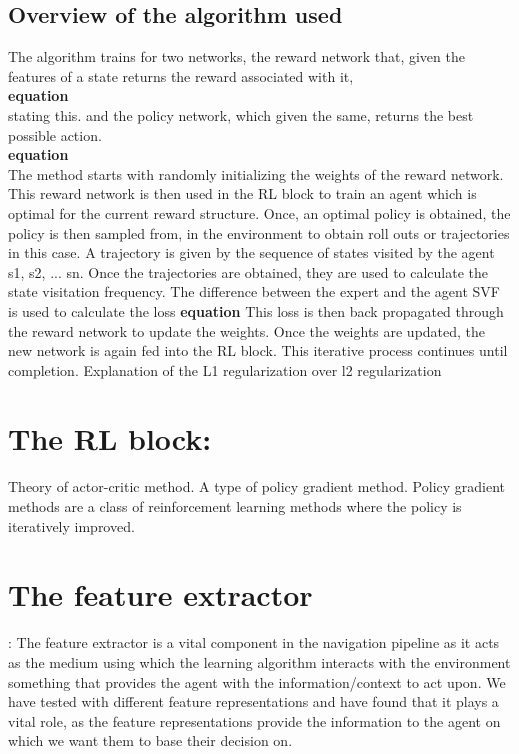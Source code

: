 \subsection*{Overview of the algorithm used}
The algorithm trains for two networks, the reward network that, given the features of a state returns the reward associated with it,\\
\textbf{equation}\\ stating this.
and the policy network, which given the same, returns the best possible action.\\
\textbf{equation}\\
The method starts with randomly initializing the weights of the reward network. This reward network is then used in the  RL block to train an agent which is optimal for the current reward structure. Once, an optimal policy is obtained, the policy is then sampled from, in the environment to obtain roll outs or trajectories in this case. A trajectory is given by the sequence of states visited by the agent {s1, s2, ... sn}.
Once the trajectories are obtained, they are used to calculate the state visitation frequency. The difference between the expert and the agent SVF is used to calculate the loss
\textbf{equation}
This loss is then back propagated through the reward network to update the weights.
Once the weights are updated, the new network is again fed into the RL block. This iterative process continues until completion.
Explanation of the L1 regularization over l2 regularization 

\section*{The RL block:}
Theory of actor-critic method. A type of policy gradient method. Policy gradient methods are a class of reinforcement learning methods where the policy is iteratively improved.


\section*{The feature extractor}:
The feature extractor is a vital component in the navigation pipeline as it acts as the medium using which the learning algorithm interacts with the environment something that provides the agent with the information/context to act upon. 
We have tested with different feature representations and have found that it plays a vital role, as the feature representations provide the information to the agent on which we want them to base their decision on.

